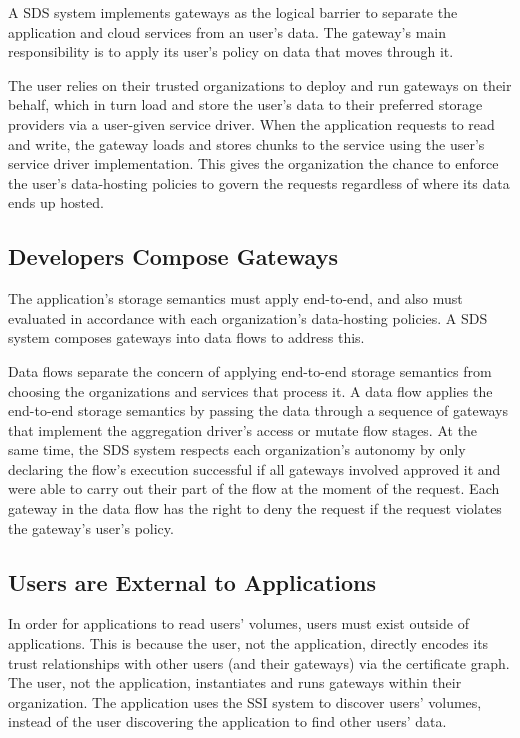A SDS system implements gateways as
the logical barrier to separate the application and
cloud services from an user's data.  The gateway's main
responsibility is to apply its user's policy on data
that moves through it.

The user relies on their trusted organizations to deploy and run gateways on
their behalf, which in turn load and store the user's data to their preferred
storage providers via a user-given service driver.
When the application requests to read and write, the
gateway loads and stores chunks to the service using the user's
service driver implementation.  This gives the organization the chance to
enforce the user's data-hosting policies to govern the requests regardless of where its data
ends up hosted.

\subsection{Developers Compose Gateways}

The application's storage semantics must apply end-to-end, and also must 
evaluated in accordance with each organization's data-hosting policies.
A SDS system composes gateways into data flows to address this.

Data flows separate the concern of applying end-to-end storage semantics from 
choosing the organizations and services that process it.  A data flow applies
the end-to-end storage semantics by passing the data through a sequence of
gateways that implement the aggregation driver's access or mutate flow stages.
At the same time, the SDS system respects each organization's autonomy by
only declaring the flow's execution successful if all gateways involved approved it
and were able to carry out their part of the flow at the moment of the request.
Each gateway in the data flow has the right to deny the request if the request
violates the gateway's user's policy.

\subsection{Users are External to Applications}

In order for applications to read users' volumes, users must exist outside of
applications.  This is because the user, not the application, directly encodes
its trust relationships with other users (and their gateways) via the
certificate graph.  The user, not the application, instantiates and runs
gateways within their organization.  The application uses the SSI system to
discover users' volumes, instead of the user discovering the application to find
other users' data.

